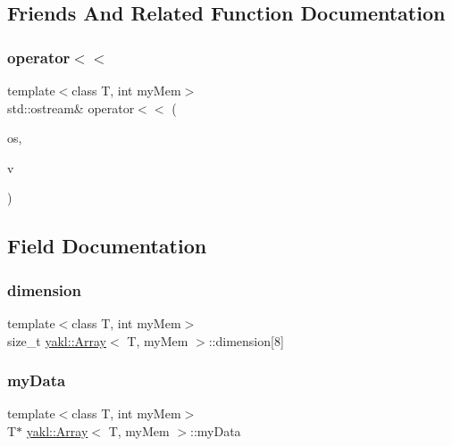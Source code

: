 \subsection{Friends And Related Function Documentation}
\mbox{\label{classyakl_1_1Array_af3c30c6a8edc4832f6196fd3f2b4e2e5}} 
\subsubsection{\texorpdfstring{operator$<$$<$}{operator<<}}
{\footnotesize\ttfamily template$<$class T, int my\+Mem$>$ \\
std\+::ostream\& operator$<$$<$ (\begin{DoxyParamCaption}\item[{std\+::ostream \&}]{os,  }\item[{\hyperlink{classyakl_1_1Array}{Array}$<$ T, my\+Mem $>$ const \&}]{v }\end{DoxyParamCaption})\hspace{0.3cm}{\ttfamily [friend]}}



\subsection{Field Documentation}
\mbox{\label{classyakl_1_1Array_a0ccbe72c84f403916ede27ca59fadff5}} 
\subsubsection{\texorpdfstring{dimension}{dimension}}
{\footnotesize\ttfamily template$<$class T, int my\+Mem$>$ \\
size\+\_\+t \hyperlink{classyakl_1_1Array}{yakl\+::\+Array}$<$ T, my\+Mem $>$\+::dimension\mbox{[}8\mbox{]}}

\mbox{\label{classyakl_1_1Array_affc83b170224c420db2a3de1ed8752f7}} 
\subsubsection{\texorpdfstring{my\+Data}{myData}}
{\footnotesize\ttfamily template$<$class T, int my\+Mem$>$ \\
T$\ast$ \hyperlink{classyakl_1_1Array}{yakl\+::\+Array}$<$ T, my\+Mem $>$\+::my\+Data}

